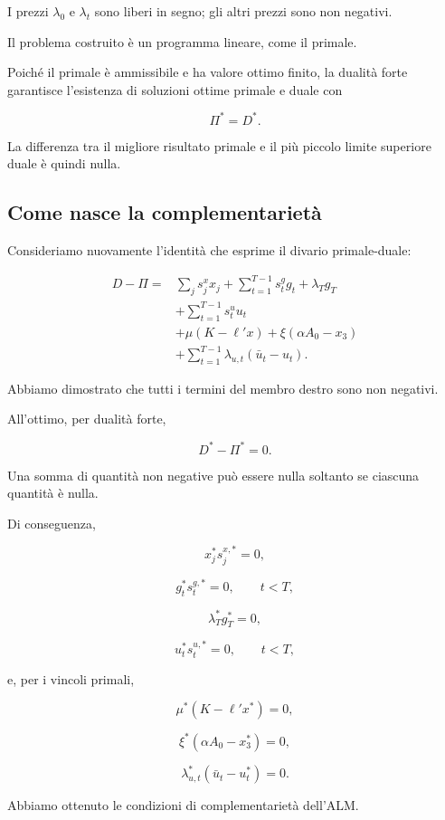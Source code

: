 I prezzi $\lambda_0$ e $\lambda_t$
sono liberi in segno; gli altri prezzi
sono non negativi.

Il problema costruito \`{e} un programma
lineare, come il primale.

Poich\'{e} il primale \`{e} ammissibile
e ha valore ottimo finito, la dualit\`{a}
forte garantisce l'esistenza di soluzioni
ottime primale e duale con

\[
\boxed{\Pi^*=D^*.}
\]

La differenza tra il migliore risultato
primale e il pi\`{u} piccolo limite
superiore duale \`{e} quindi nulla.

\subsection{Come nasce la complementariet\`{a}}

Consideriamo nuovamente l'identit\`{a}
che esprime il divario primale-duale:

\[
\begin{aligned}
D-\Pi
={}&
\sum_j s_j^xx_j
+\sum_{t=1}^{T-1}s_t^gg_t
+\lambda_Tg_T\\
&+\sum_{t=1}^{T-1}s_t^uu_t\\
&+\mu(K-\ell'x)
+\xi(\alpha A_0-x_3)\\
&+\sum_{t=1}^{T-1}
\lambda_{u,t}(\bar u_t-u_t).
\end{aligned}
\]

Abbiamo dimostrato che tutti i termini
del membro destro sono non negativi.

All'ottimo, per dualit\`{a} forte,

\[
D^*-\Pi^*=0.
\]

Una somma di quantit\`{a} non negative
pu\`{o} essere nulla soltanto se
ciascuna quantit\`{a} \`{e} nulla.

Di conseguenza,

\[
x_j^*s_j^{x,*}=0,
\]

\[
g_t^*s_t^{g,*}=0,
\qquad t<T,
\]

\[
\lambda_T^*g_T^*=0,
\]

\[
u_t^*s_t^{u,*}=0,
\qquad t<T,
\]

\noindent e, per i vincoli primali,

\[
\mu^*(K-\ell'x^*)=0,
\]

\[
\xi^*(\alpha A_0-x_3^*)=0,
\]

\[
\lambda_{u,t}^*
(\bar u_t-u_t^*)=0.
\]

Abbiamo ottenuto le condizioni di
complementariet\`{a} dell'ALM.

